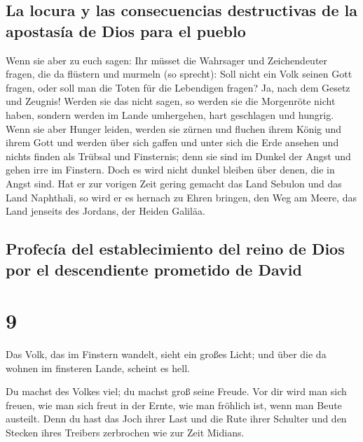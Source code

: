 \hypertarget{la-locura-y-las-consecuencias-destructivas-de-la-apostasuxeda-de-dios-para-el-pueblo}{%
\subsection{La locura y las consecuencias destructivas de la apostasía
de Dios para el
pueblo}\label{la-locura-y-las-consecuencias-destructivas-de-la-apostasuxeda-de-dios-para-el-pueblo}}

 Wenn sie aber zu euch sagen: Ihr müsset die Wahrsager
und Zeichendeuter fragen, die da flüstern und murmeln (so sprecht): Soll
nicht ein Volk seinen Gott fragen, oder soll man die Toten für die
Lebendigen fragen?  Ja, nach dem Gesetz und Zeugnis!
Werden sie das nicht sagen, so werden sie die Morgenröte nicht haben,
 sondern werden im Lande umhergehen, hart geschlagen und
hungrig. Wenn sie aber Hunger leiden, werden sie zürnen und fluchen
ihrem König und ihrem Gott  und werden über sich gaffen
und unter sich die Erde ansehen und nichts finden als Trübsal und
Finsternis; denn sie sind im Dunkel der Angst und gehen irre im
Finstern.  Doch es wird nicht dunkel bleiben über denen,
die in Angst sind. Hat er zur vorigen Zeit gering gemacht das Land
Sebulon und das Land Naphthali, so wird er es hernach zu Ehren bringen,
den Weg am Meere, das Land jenseits des Jordans, der Heiden Galiläa.

\hypertarget{profecuxeda-del-establecimiento-del-reino-de-dios-por-el-descendiente-prometido-de-david}{%
\subsection{Profecía del establecimiento del reino de Dios por el
descendiente prometido de
David}\label{profecuxeda-del-establecimiento-del-reino-de-dios-por-el-descendiente-prometido-de-david}}

\hypertarget{section-8}{%
\section{9}\label{section-8}}

 Das Volk, das im Finstern wandelt, sieht ein großes
Licht; und über die da wohnen im finsteren Lande, scheint es hell.

 Du machst des Volkes viel; du machst groß seine Freude.
Vor dir wird man sich freuen, wie man sich freut in der Ernte, wie man
fröhlich ist, wenn man Beute austeilt.  Denn du hast das
Joch ihrer Last und die Rute ihrer Schulter und den Stecken ihres
Treibers zerbrochen wie zur Zeit Midians.

